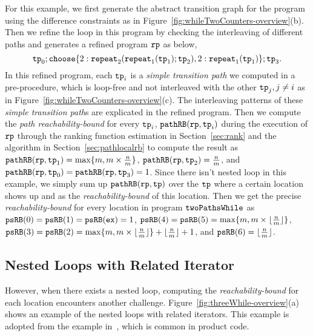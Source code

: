 For this example, we first
generate the abstract transition graph for the program using the difference constraints as in Figure~\ref{fig:whileTwoCounters-overview}(b).
Then we refine the loop in this program by checking the interleaving of different paths and
generates a refined program $\mathtt{rp}$ as below,
% 
\[ 
  \tpath_0 ; 
 \rpchoose{2: \rprepeat_2(\rprepeat_1(\tpath_1); \tpath_2), 
 2: \rprepeat_1(\tpath_1)}; \tpath_3.
\]
In this refined program,
each $\mathtt{tp}_i$ is a \emph{simple transition path} we computed in a pre-procedure, which is loop-free and not interleaved with the other $\mathtt{tp}_j, j \neq i$ as in Figure~\ref{fig:whileTwoCounters-overview}(c).
The interleaving patterns of these \emph{simple transition path}s are explicated in the refined program.
Then we compute the \emph{path reachability-bound} for every $\mathtt{tp}_i$,
$\mathtt{pathRB}(\mathtt{rp}, \mathtt{tp}_i)$ during the execution of $\mathtt{rp}$ through the ranking function estimation in Section~\ref{sec:rank} and the algorithm in Section~\ref{sec:pathlocalrb} to compute the result as
$\mathtt{pathRB}(\mathtt{rp}, \mathtt{tp}_1) = \max\{m, m \times \frac{n}{m} \}$,
$\mathtt{pathRB}(\mathtt{rp}, \mathtt{tp}_2) = \frac{n}{m}$,
and $\mathtt{pathRB}(\mathtt{rp}, \mathtt{tp}_0) = \mathtt{pathRB}(\mathtt{rp}, \mathtt{tp}_3) = 1$.
Since there isn't nested loop in this example, we simply sum up $\mathtt{pathRB}(\mathtt{rp}, \mathtt{tp})$ over the $\mathtt{tp}$ where a certain location shows up
and as the \emph{reachability-bound} of this location.
Then we get the precise \emph{reachability-bound} for every location in program $\mathtt{twoPathsWhile}$ as
$\mathtt{psRB}(0) = \mathtt{psRB}(1) = \mathtt{psRB}(\mathtt{ex}) = 1$,
$\mathtt{psRB}(4) = \mathtt{psRB}(5) = \max\{m, m \times \lfloor\frac{n}{m}\rfloor\}$,
$\mathtt{psRB}(3) = \mathtt{psRB}(2) = \max\{m, m \times \lfloor\frac{n}{m}\rfloor\} + \lfloor\frac{n}{m}\rfloor + 1 $,
and $\mathtt{psRB}(6) = \lfloor\frac{n}{m}\rfloor$.
%
\subsection{Nested Loops with Related Iterator}
\label{sec:overview-nestedwhile}
However, when there exists a nested loop, computing the \emph{reachability-bound} for each location encounters another challenge.
Figure~\ref{fig:threeWhile-overview}(a) shows an example of the nested loops with related 
iterators.
This example is adopted from the example in~\cite{GulwaniJK09}, which is common in product code.


